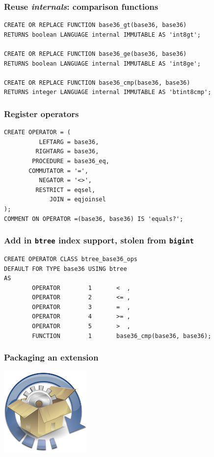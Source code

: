 \documentclass{beamer}
\begin{document}
\begin{frame}[fragile]
  \frametitle{Reuse \textit{internals}: comparison functions}

\begin{verbatim}
CREATE OR REPLACE FUNCTION base36_gt(base36, base36) 
RETURNS boolean LANGUAGE internal IMMUTABLE AS 'int8gt';

CREATE OR REPLACE FUNCTION base36_ge(base36, base36) 
RETURNS boolean LANGUAGE internal IMMUTABLE AS 'int8ge';

CREATE OR REPLACE FUNCTION base36_cmp(base36, base36) 
RETURNS integer LANGUAGE internal IMMUTABLE AS 'btint8cmp';
\end{verbatim}
\end{frame}

\begin{frame}[fragile]
  \frametitle{Register operators}

\begin{verbatim}
CREATE OPERATOR = (
          LEFTARG = base36,
         RIGHTARG = base36,
        PROCEDURE = base36_eq,
       COMMUTATOR = '=',
          NEGATOR = '<>',
         RESTRICT = eqsel,
             JOIN = eqjoinsel
);
COMMENT ON OPERATOR =(base36, base36) IS 'equals?';
\end{verbatim}
\end{frame}

\begin{frame}[fragile]
  \frametitle{Add in \texttt{btree} index support, stolen from \texttt{bigint}}

\begin{verbatim}
CREATE OPERATOR CLASS btree_base36_ops
DEFAULT FOR TYPE base36 USING btree
AS
        OPERATOR        1       <  ,
        OPERATOR        2       <= ,
        OPERATOR        3       =  ,
        OPERATOR        4       >= ,
        OPERATOR        5       >  ,
        FUNCTION        1       base36_cmp(base36, base36);
\end{verbatim}
\end{frame}

\begin{frame}[fragile]
  \frametitle{Packaging an extension}

\begin{center}
  \includegraphics[height=12em]{software-upgrade.png}
\end{center}
\end{frame}
\end{document}
